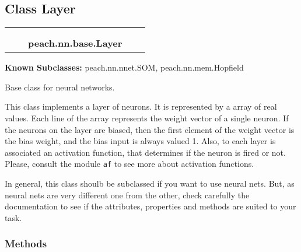 
\subsection{Class Layer}

    \label{peach:nn:base:Layer}
\begin{tabular}{cccccc}
\multicolumn{2}{r}{\settowidth{\BCL}{object}\multirow{2}{\BCL}{object}}
&&
  \\\cline{3-3}
  &&\multicolumn{1}{c|}{}
&&
  \\
&&\multicolumn{2}{l}{\textbf{peach.nn.base.Layer}}
\end{tabular}

\textbf{Known Subclasses:}
peach.nn.nnet.SOM,
    peach.nn.mem.Hopfield


Base class for neural networks.

This class implements a layer of neurons. It is represented by a array of
real values. Each line of the array represents the weight vector of a
single neuron. If the neurons on the layer are biased, then the first
element of the weight vector is the bias weight, and the bias input is
always valued 1. Also, to each layer is associated an activation function,
that determines if the neuron is fired or not. Please, consult the module
\texttt{af} to see more about activation functions.

In general, this class shoulb be subclassed if you want to use neural nets.
But, as neural nets are very different one from the other, check carefully
the documentation to see if the attributes, properties and methods are
suited to your task.


  \subsubsection{Methods}

